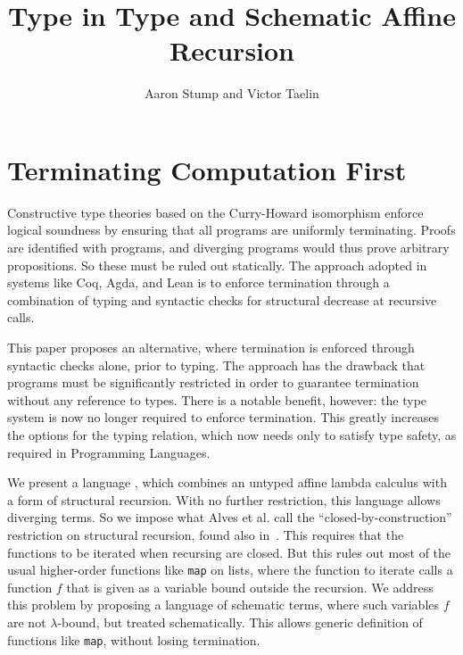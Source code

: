 \documentclass{article}
\begin{document}


\title{Type in Type and Schematic Affine Recursion}

\author{Aaron Stump and Victor Taelin}

\maketitle

\section{Terminating Computation First}

Constructive type theories based on the Curry-Howard isomorphism
enforce logical soundness by ensuring that all programs are uniformly
terminating.  Proofs are identified with programs, and diverging
programs would thus prove arbitrary propositions.  So these must be
ruled out statically.  The approach adopted in systems like Coq, Agda,
and Lean is to enforce termination through a combination of typing
and syntactic checks for structural decrease at recursive calls.

This paper proposes an alternative, where termination is enforced
through syntactic checks alone, prior to typing.  The approach has the
drawback that programs must be significantly restricted in order to
guarantee termination without any reference to types.  There is a
notable benefit, however: the type system is now no longer required to
enforce termination.  This greatly increases the options for the
typing relation, which now needs only to satisfy type safety, as
required in Programming Languages.

We present a language \sar, which combines an untyped affine lambda
calculus with a form of structural recursion.  With no further
restriction, this language allows diverging terms.  So we impose what
Alves et al. call the ``closed-by-construction'' restriction on
structural recursion, found also in~\cite{dallago09}.  This requires
that the functions to be iterated when recursing are closed.  But this
rules out most of the usual higher-order functions like \texttt{map}
on lists, where the function to iterate calls a function $f$ that
is given as a variable bound outside the recursion.  We address this
problem by proposing a language of schematic terms, where such variables
$f$ are not $\lambda$-bound, but treated schematically.  This allows
generic definition of functions like \texttt{map}, without losing
termination.
\end{document}
